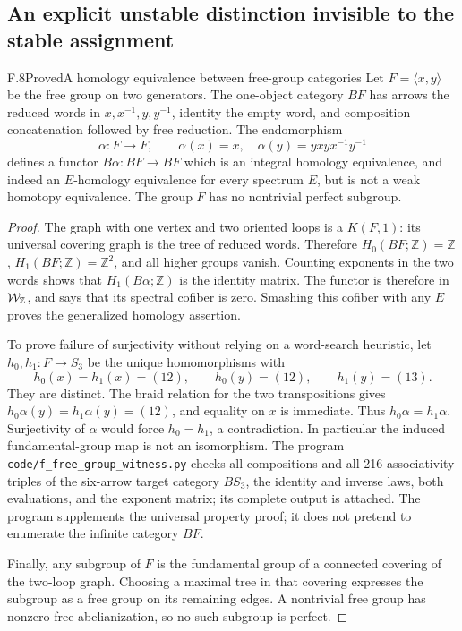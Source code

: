 \subsection{An explicit unstable distinction invisible to the stable assignment}

\begin{claim}{F.8}{Proved}{A homology equivalence between free-group categories}
Let $F=\langle x,y\rangle$ be the free group on two generators. The
one-object category $BF$ has arrows the reduced words in
$x,x^{-1},y,y^{-1}$, identity the empty word, and composition concatenation
followed by free reduction. The endomorphism
\[
 \alpha:F\longrightarrow F,\qquad
 \alpha(x)=x,\quad \alpha(y)=yxyx^{-1}y^{-1}
\]
defines a functor $B\alpha:BF\to BF$ which is an integral homology
equivalence, and indeed an $E$-homology equivalence for every spectrum
$E$, but is not a weak homotopy equivalence. The group $F$ has no
nontrivial perfect subgroup.
\end{claim}
\begin{proof}
The graph with one vertex and two oriented loops is a $K(F,1)$: its
universal covering graph is the tree of reduced words. Therefore
$H_0(BF;\mathbb Z)=\mathbb Z$, $H_1(BF;\mathbb Z)=\mathbb Z^2$, and
all higher groups vanish. Counting exponents in the two words shows that
$H_1(B\alpha;\mathbb Z)$ is the identity matrix. The functor is therefore
in $\mathcal{W}_{\mathbb Z}$, and  says that its spectral cofiber is zero.
Smashing this cofiber with any $E$ proves the generalized homology assertion.

To prove failure of surjectivity without relying on a word-search
heuristic, let $h_0,h_1:F\to S_3$ be the unique homomorphisms with
\[
 h_0(x)=h_1(x)=(12),\qquad
 h_0(y)=(12),\qquad h_1(y)=(13).
\]
They are distinct. The braid relation for the two transpositions gives
$h_0\alpha(y)=h_1\alpha(y)=(12)$, and equality on $x$ is immediate.
Thus $h_0\alpha=h_1\alpha$. Surjectivity of $\alpha$ would force
$h_0=h_1$, a contradiction. In particular the induced fundamental-group
map is not an isomorphism. The program
\texttt{code/f\_free\_group\_witness.py} checks all compositions and
all 216 associativity triples of the six-arrow target category $BS_3$,
the identity and inverse laws, both evaluations, and the exponent matrix;
its complete output is attached. The program supplements the universal
property proof; it does not pretend to enumerate the infinite category $BF$.

Finally, any subgroup of $F$ is the fundamental group of a connected
covering of the two-loop graph. Choosing a maximal tree in that covering
expresses the subgroup as a free group on its remaining edges. A nontrivial
free group has nonzero free abelianization, so no such subgroup is perfect.
\end{proof}

